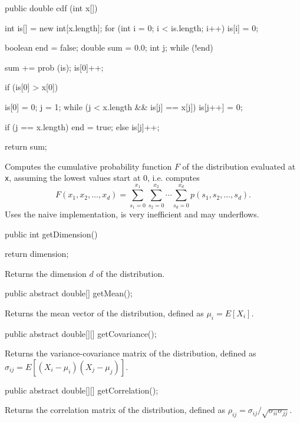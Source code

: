 \begin{code}

   public double cdf (int x[])\begin{hide} {
      int is[] = new int[x.length];
      for (int i = 0; i < is.length; i++)
         is[i] = 0;

      boolean end = false;
      double sum = 0.0;
      int j;
      while (!end) {
         sum += prob (is);
         is[0]++;

         if (is[0] > x[0]) {
            is[0] = 0;
            j = 1;
            while (j < x.length && is[j] == x[j])
               is[j++] = 0;

            if (j == x.length)
               end = true;
            else
               is[j]++;
         }
      }

      return sum;
   }\end{hide}
\end{code}
\begin{tabb}
   Computes the cumulative probability function $F$ of the distribution evaluated
   at \texttt{x}, assuming the lowest values start at 0, i.e. computes
$$
  F (x_1, x_2, \ldots, x_d) = 
  \sum_{s_1=0}^{x_1} \sum_{s_2=0}^{x_2} \cdots
   \sum_{s_d=0}^{x_d} p(s_1, s_2, \ldots, s_d).
$$
   Uses the naive implementation, is very inefficient and may underflows.
\end{tabb}
\begin{code}

   public int getDimension()\begin{hide} {
      return dimension;
   }\end{hide}
\end{code}
\begin{tabb}
   Returns the dimension $d$ of the distribution.
\end{tabb}
\begin{code}

   public abstract double[] getMean();
\end{code}
\begin{tabb}
   Returns the mean vector of the distribution, defined as $\mu_{i} = E[X_i]$.
\end{tabb}
\begin{code}

   public abstract double[][] getCovariance();
\end{code}
\begin{tabb}
   Returns the variance-covariance matrix of the distribution, defined as\\
   $\sigma_{ij} = E[(X_i - \mu_i)(X_j - \mu_j)]$.
\end{tabb}
\begin{code}

   public abstract double[][] getCorrelation();
\end{code}
\begin{tabb}
   Returns the correlation matrix of the distribution, defined as
      $\rho_{ij} = \sigma_{ij}/\sqrt{\sigma_{ii}\sigma_{jj}}$.
\end{tabb}
\begin{code}\begin{hide}
}\end{hide}
\end{code}
